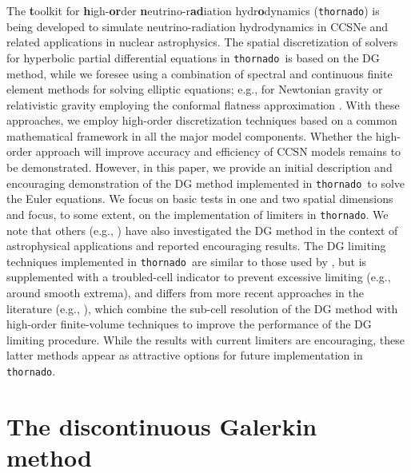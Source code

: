 \documentclass[letterpaper]{jpconf}
\newcommand{\thornado}{\texttt{thornado}}
\begin{document}
The {\bf t}oolkit for {\bf h}igh-{\bf or}der {\bf n}eutrino-r{\bf ad}iation hydr{\bf o}dynamics (\thornado) is being developed to simulate neutrino-radiation hydrodynamics in CCSNe and related applications in nuclear astrophysics.  
The spatial discretization of solvers for hyperbolic partial differential equations in \thornado\ is based on the DG method, while we foresee using a combination of spectral and continuous finite element methods for solving elliptic equations; e.g., for Newtonian gravity or relativistic gravity employing the conformal flatness approximation \cite{wilson_etal_1996}.  
With these approaches, we employ high-order discretization techniques based on a common mathematical framework in all the major model components.  
Whether the high-order approach will improve accuracy and efficiency of CCSN models remains to be demonstrated.  
However, in this paper, we provide an initial description and encouraging demonstration of the DG method implemented in \thornado\ to solve the Euler equations.  
We focus on basic tests in one and two spatial dimensions and focus, to some extent, on the implementation of limiters in \thornado.  
We note that others (e.g., \cite{radiceRezzolla_2011,schaal_etal_2015,zanotti_etal_2015,dumbser_etal_2018}) have also investigated the DG method in the context of astrophysical applications and reported encouraging results.  
The DG limiting techniques implemented in \thornado\ are similar to those used by \cite{schaal_etal_2015}, but is supplemented with a troubled-cell indicator \cite{fuShu_2017} to prevent excessive limiting (e.g., around smooth extrema), and differs from more recent approaches in the literature (e.g., \cite{huerta_etal_2012,dumbser_etal_2014,zanotti_etal_2015,sonntagMunz_2017}), which combine the sub-cell resolution of the DG method with high-order finite-volume techniques to improve the performance of the DG limiting procedure.  
While the results with current limiters are encouraging, these latter methods appear as attractive options for future implementation in \thornado.  

\section{The discontinuous Galerkin method}
\end{document}
